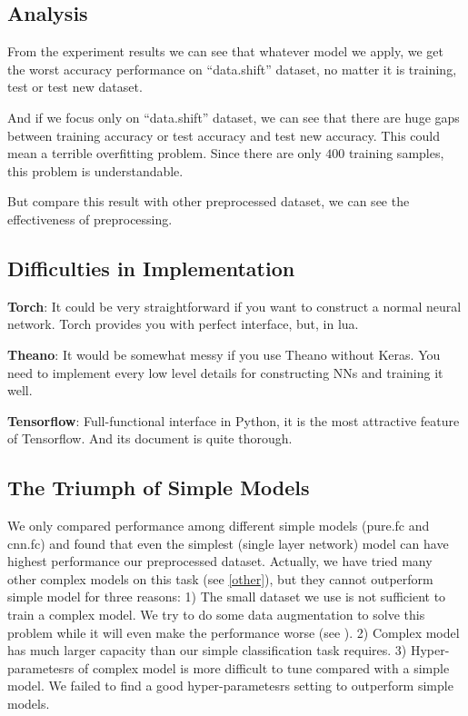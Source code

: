 \documentclass[a4paper]{article}
\begin{document}
\subsection{Analysis}

From the experiment results we can see that whatever model we apply, we get the worst accuracy performance on ``data.shift'' dataset, no matter it is training, test or test new dataset.

And if we focus only on ``data.shift'' dataset, we can see that there are huge gaps between training accuracy or test accuracy and test new accuracy. This could mean a terrible overfitting problem. Since there are only $400$ training samples, this problem is understandable.

But compare this result with other preprocessed dataset, we can see the effectiveness of preprocessing.

\subsection{Difficulties in Implementation}
{\bf Torch}: It could be very straightforward if you want to construct a normal neural network. Torch provides you with perfect interface, but, in lua.

{\bf Theano}: It would be somewhat messy if you use Theano without Keras. You need to implement every low level details for constructing NNs and training it well. 

{\bf Tensorflow}: Full-functional interface in Python, it is the most attractive feature of Tensorflow.  And its document is quite thorough.

\subsection{The Triumph of Simple Models}
We only compared performance among different simple models (pure.fc and cnn.fc) and found that even the simplest (single layer network) model can have highest performance our preprocessed dataset. Actually, we have tried many other complex models on this task (see \ref{other}), but they cannot outperform simple model for three reasons: 1) The small dataset we use is not sufficient to train a complex model. We try to do some data augmentation to solve this problem while it will even make the performance worse (see \label{dae}). 2) Complex model has much larger capacity than our simple classification task requires. 3) Hyper-parametesrs of complex model is more difficult to tune compared with a simple model. We failed to find a good hyper-parametesrs setting to outperform simple models.


%
% 
%
\end{document}
